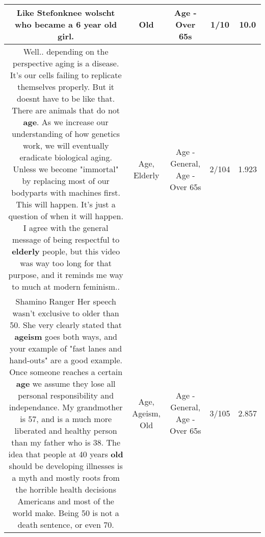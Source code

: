 \documentclass[11pt]{article}
\newlength\mylength
\begin{document}
\begin{center}
\begin{longtable}{|C{.65\mylength}|C{.30\mylength}|C{.12\mylength}|C{.12\mylength}|C{.12\mylength}|}
  \small Like Stefonknee wolscht who became a 6 year \textbf{old} girl.\normalsize   & Old & Age - Over 65s & 1/10 & 10.0 \\  \hline
  \small Well.. depending on the perspective aging is a disease. It's our cells failing to replicate themselves properly. But it doesnt have to be like that. There are animals that do not \textbf{age}. As we increase our understanding of how genetics work, we will eventually eradicate biological aging. Unless we become "immortal" by replacing most of our bodyparts with machines first. This will happen. It's just a question of when it will happen. I agree with the general message of being respectful to \textbf{elderly} people, but this video was way too long for that purpose, and it reminds me way to much at modern feminism..\normalsize   & Age, Elderly & Age - General, Age - Over 65s & 2/104 & 1.923 \\  \hline
  \small Shamino Ranger Her speech wasn't exclusive to older than 50. She very clearly stated that \textbf{ageism} goes both ways, and your example of "fast lanes and hand-outs" are a good example. Once someone reaches a certain \textbf{age} we assume they lose all personal responsibility and independance. My grandmother is 57, and is a much more liberated and healthy person than my father who is 38. The idea that people at 40 years \textbf{old} should be developing illnesses is a myth and mostly roots from the horrible health decisions Americans and most of the world make. Being 50 is not a death sentence, or even 70.\normalsize   & Age, Ageism, Old & Age - General, Age - Over 65s & 3/105 & 2.857 \\  \hline

\end{longtable}
\end{center}
\end{document}
